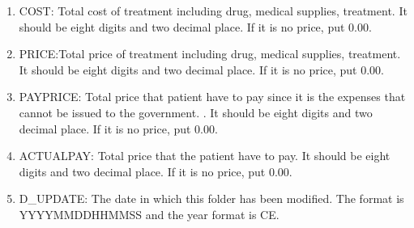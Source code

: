 \begin{enumerate}
  \item COST: Total cost of treatment including drug, medical supplies, treatment. It should be eight digits and two decimal place. If it is no price, put 0.00.
  \item PRICE:Total price of treatment including drug, medical supplies, treatment. It should be eight digits and two decimal place. If it is no price, put 0.00.
  \item PAYPRICE: Total price that patient have to pay since it is the expenses that cannot be issued to the government. . It should be eight digits and two decimal place. If it is no price, put 0.00.
  \item ACTUALPAY: Total price that the patient have to pay. It should be eight digits and two decimal place. If it is no price, put 0.00.
  \item D\_UPDATE: The date in which this folder has been modified. The format is YYYYMMDDHHMMSS and the year format is CE.
  
  
\end{enumerate}